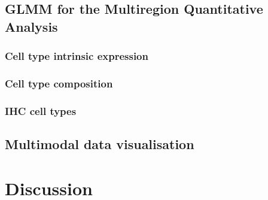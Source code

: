 \subsection{GLMM for the Multiregion Quantitative Analysis}

\subsubsection*{Cell type intrinsic expression}
\subsubsection*{Cell type composition}
\subsubsection*{IHC cell types}

\subsection{Multimodal data visualisation}

\section{Discussion}